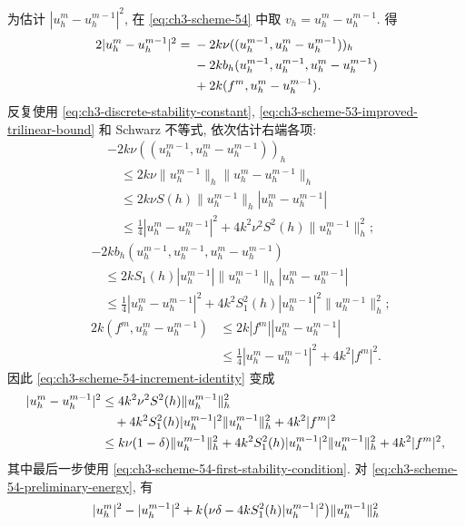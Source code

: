 {\begin{Proof}
\hypertarget{chapter-03-page-249}{}
为估计 $|u_h^m-u_h^{m-1}|^2$, 在 \eqref{eq:ch3-scheme-54} 中取 $v_h=u_h^m-u_h^{m-1}$. 得
\begin{align}
2|u_h^m-u_h^{m-1}|^2
={}&-2k\nu((u_h^{m-1},u_h^m-u_h^{m-1}))_h\notag\\
&-2kb_h(u_h^{m-1},u_h^{m-1},u_h^m-u_h^{m-1})\notag\\
&+2k(f^m,u_h^m-u_h^{m-1}).
\label{eq:ch3-scheme-54-increment-identity}
\end{align}
反复使用 \eqref{eq:ch3-discrete-stability-constant}, \eqref{eq:ch3-scheme-53-improved-trilinear-bound} 和 Schwarz 不等式, 依次估计右端各项:
\begin{align*}
&-2k\nu((u_h^{m-1},u_h^m-u_h^{m-1}))_h\\
&\quad\leq2k\nu\lVert u_h^{m-1}\rVert_h\lVert u_h^m-u_h^{m-1}\rVert_h\\
&\quad\leq2k\nu S(h)\lVert u_h^{m-1}\rVert_h|u_h^m-u_h^{m-1}|\\
&\quad\leq\frac14|u_h^m-u_h^{m-1}|^2
+4k^2\nu^2S^2(h)\lVert u_h^{m-1}\rVert_h^2;
\end{align*}
\begin{align*}
&-2kb_h(u_h^{m-1},u_h^{m-1},u_h^m-u_h^{m-1})\\
&\quad\leq2kS_1(h)|u_h^{m-1}|\lVert u_h^{m-1}\rVert_h|u_h^m-u_h^{m-1}|\\
&\quad\leq\frac14|u_h^m-u_h^{m-1}|^2
+4k^2S_1^2(h)|u_h^{m-1}|^2\lVert u_h^{m-1}\rVert_h^2;
\end{align*}
\begin{align*}
2k(f^m,u_h^m-u_h^{m-1})
&\leq2k|f^m||u_h^m-u_h^{m-1}|\\
&\leq\frac14|u_h^m-u_h^{m-1}|^2+4k^2|f^m|^2.
\end{align*}
因此 \eqref{eq:ch3-scheme-54-increment-identity} 变成
\begin{align}
|u_h^m-u_h^{m-1}|^2
&\leq4k^2\nu^2S^2(h)\lVert u_h^{m-1}\rVert_h^2\notag\\
&\quad+4k^2S_1^2(h)|u_h^{m-1}|^2\lVert u_h^{m-1}\rVert_h^2
+4k^2|f^m|^2\notag\\
&\leq k\nu(1-\delta)\lVert u_h^{m-1}\rVert_h^2
+4k^2S_1^2(h)|u_h^{m-1}|^2\lVert u_h^{m-1}\rVert_h^2
+4k^2|f^m|^2,
\label{eq:ch3-scheme-54-increment-estimate}
\end{align}
其中最后一步使用 \eqref{eq:ch3-scheme-54-first-stability-condition}. 对 \eqref{eq:ch3-scheme-54-preliminary-energy}, 有
\begin{align}
&|u_h^m|^2-|u_h^{m-1}|^2
+k\bigl(\nu\delta-4kS_1^2(h)|u_h^{m-1}|^2\bigr)
\lVert u_h^{m-1}\rVert_h^2\notag\\

\end{align}
\end{Proof}}
